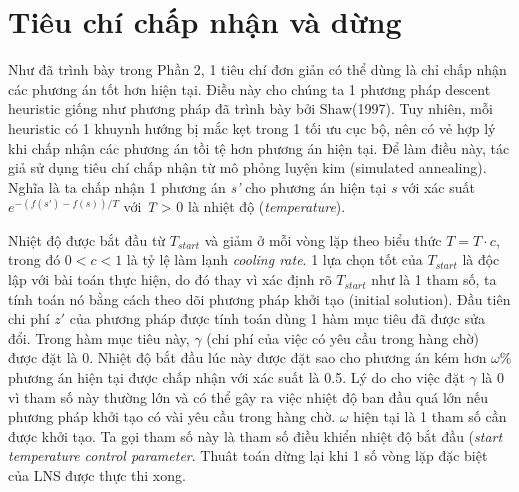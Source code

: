 \section{Tiêu chí chấp nhận và dừng}
Như đã trình bày trong Phần 2, 1 tiêu chí đơn giản có thể dùng là chỉ chấp nhận các phương án tốt hơn hiện tại. Điều này cho chúng ta 1 phương pháp descent heuristic giống như phương pháp đã trình bày bởi Shaw(1997). Tuy nhiên, mỗi heuristic có 1 khuynh hướng bị mắc kẹt trong 1 tối ưu cục bộ, nên có vẻ hợp lý khi chấp nhận các phương án tồi tệ hơn phương án hiện tại. Để làm điều này, tác giả sử dụng tiêu chí chấp nhận từ mô phỏng luyện kim (simulated annealing). Nghĩa là ta chấp nhận 1 phương án \textit{s'} cho phương án hiện tại \textit{s} với xác suất $e^{-(f(s')-f(s))/T}$ với \textit{T} > 0 là nhiệt độ (\textit{temperature}).

Nhiệt độ được bắt đầu từ $T_{start}$ và giảm ở mỗi vòng lặp theo biểu thức $T=T \cdot c$, trong đó $0<c<1$ là tỷ lệ làm lạnh \textit{cooling rate}. 1 lựa chọn tốt của $T_{start}$ là độc lập với bài toán thực hiện, do đó thay vì xác định rõ $T_{start}$ như là 1 tham số, ta tính toán nó bằng cách theo dõi phương pháp khởi tạo (initial solution). Đầu tiên chi phí $z'$ của phương pháp được tính toán dùng 1 hàm mục tiêu đã được sửa đổi. Trong hàm mục tiêu này, $\gamma$ (chi phí của việc có yêu cầu trong hàng chờ) được đặt là 0. Nhiệt độ bắt đầu lúc này được đặt sao cho phương án kém hơn $\omega\%$ phương án hiện tại được chấp nhận với xác suất là 0.5. Lý do cho việc đặt $\gamma$ là 0 vì tham số này thường lớn và có thể gây ra việc nhiệt độ ban đầu quá lớn nếu phương pháp khởi tạo có vài yêu cầu trong hàng chờ. $\omega$ hiện tại là 1 tham số cần được khởi tạo. Ta gọi tham số này là tham số điều khiển nhiệt độ bắt đầu (\textit{start temperature control parameter}. Thuât toán dừng lại khi 1 số vòng lặp đặc biệt của LNS được thực thi xong.
